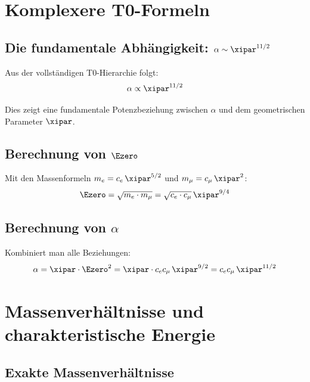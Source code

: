 	\section{Komplexere T0-Formeln}
	
	\subsection[Die fundamentale Abhaengigkeit]{Die fundamentale Abhängigkeit: $\alpha \sim \xipar^{11/2}$}
	
	Aus der vollständigen T0-Hierarchie folgt:
	\begin{equation}
		\alpha \propto \xipar^{11/2}
	\end{equation}
	
	Dies zeigt eine fundamentale Potenzbeziehung zwischen $\alpha$ und dem geometrischen Parameter $\xipar$.
	
	\subsection[Berechnung von E0]{Berechnung von $\Ezero$}
	
	Mit den Massenformeln $m_e = c_e\,\xipar^{5/2}$ und $m_\mu = c_\mu\,\xipar^2$:
	\begin{equation}
		\Ezero = \sqrt{m_e \cdot m_\mu} = \sqrt{c_e \cdot c_\mu}\,\xipar^{9/4}
	\end{equation}

	\subsection[Berechnung von alpha]{Berechnung von $\alpha$}

	Kombiniert man alle Beziehungen:
	\begin{equation}
		\alpha = \xipar \cdot \Ezero^2 = \xipar \cdot c_e c_\mu\,\xipar^{9/2} = c_e c_\mu\,\xipar^{11/2}
	\end{equation}

	\section{Massenverhältnisse und charakteristische Energie}
	
	\subsection{Exakte Massenverhältnisse}
	
